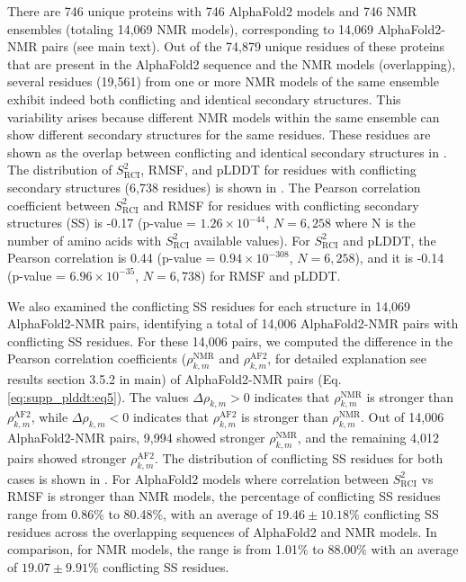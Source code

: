 There are 746 unique proteins with 746 AlphaFold2 models and 746 NMR ensembles (totaling 14,069 NMR models), corresponding to 14,069 AlphaFold2-NMR pairs (see main text). Out of the 74,879 unique residues of these proteins that are present in the AlphaFold2 sequence and the NMR models (overlapping), several residues (19,561) from one or more NMR models of the same ensemble exhibit indeed both conflicting and identical secondary structures. This variability arises because different NMR models within the same ensemble can show different secondary structures for the same residues. These residues are shown as the overlap between conflicting and identical secondary structures in . The distribution of $S^2_{\text{RCI}}$, RMSF, and pLDDT for residues with conflicting secondary structures (6,738 residues) is shown in . The Pearson correlation coefficient between $S^2_{\text{RCI}}$ and RMSF for residues with conflicting secondary structures (SS) is -0.17 (p-value = $1.26 \times 10^{-44}$, $N=6,258$ where N is the number of amino acids with $S^2_{\text{RCI}}$ available values). For $S^2_{\text{RCI}}$ and pLDDT, the Pearson correlation is 0.44 (p-value = $0.94 \times 10^{-308}$, $N=6,258$), and it is -0.14 (p-value = $6.96 \times 10^{-35}$, $N= 6,738$) for RMSF and pLDDT.

We also examined the conflicting SS residues for each structure in 14,069 AlphaFold2-NMR pairs, identifying a total of 14,006 AlphaFold2-NMR pairs with conflicting SS residues. For these 14,006 pairs, we computed the difference in the Pearson correlation coefficients ($\rho_{k,m}^{\text{NMR}}$ and $\rho_{k,m}^{\text{AF2}}$, for detailed explanation see results section 3.5.2 in main) of AlphaFold2-NMR pairs (Eq. \ref{eq:supp_plddt:eq5}). The values $\Delta \rho_{k,m} > 0$ indicates that $\rho_{k,m}^{\text{NMR}}$ is stronger than $\rho_{k,m}^{\text{AF2}}$, while $\Delta \rho_{k,m} < 0$ indicates that $\rho_{k,m}^{\text{AF2}}$ is stronger than $\rho_{k,m}^{\text{NMR}}$. Out of 14,006 AlphaFold2-NMR pairs, 9,994 showed stronger $\rho_{k,m}^{\text{NMR}}$, and the remaining 4,012 pairs showed stronger $\rho_{k,m}^{\text{AF2}}$. The distribution of conflicting SS residues for both cases is shown in . For AlphaFold2 models where correlation between $S^2_{\text{RCI}}$ vs RMSF is stronger than NMR models, the percentage of conflicting SS residues range from 0.86\% to 80.48\%, with an average of $19.46 \pm 10.18\%$ conflicting SS residues across the overlapping sequences of AlphaFold2 and NMR models. In comparison, for NMR models, the range is from 1.01\% to 88.00\% with an average of $19.07 \pm 9.91\%$ conflicting SS residues.

